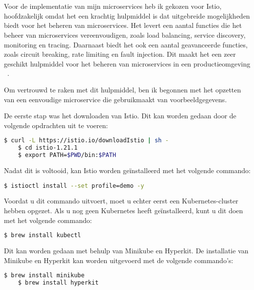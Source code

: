 \chapter*{}%
\label{ch:software}

Voor de implementatie van mijn microservices heb ik gekozen voor Istio, hoofdzakelijk omdat het een krachtig hulpmiddel is dat uitgebreide mogelijkheden biedt voor het beheren van microservices. Het levert een aantal functies die het beheer van microservices vereenvoudigen, zoals load balancing, service discovery, monitoring en tracing. Daarnaast biedt het ook een aantal geavanceerde functies, zoals circuit breaking, rate limiting en fault injection. Dit maakt het een zeer geschikt hulpmiddel voor het beheren van microservices in een productieomgeving ~\autocite{Istio}.

Om vertrouwd te raken met dit hulpmiddel, ben ik begonnen met het opzetten van een eenvoudige microservice die gebruikmaakt van voorbeeldgegevens.

De eerste stap was het downloaden van Istio. Dit kan worden gedaan door de volgende opdrachten uit te voeren:

\begin{lstlisting}[language=bash]
	$ curl -L https://istio.io/downloadIstio | sh -
	$ cd istio-1.21.1
	$ export PATH=$PWD/bin:$PATH
\end{lstlisting}

Nadat dit is voltooid, kan Istio worden geïnstalleerd met het volgende commando:

\begin{lstlisting}[language=bash]
	$ istioctl install --set profile=demo -y
\end{lstlisting}

Voordat u dit commando uitvoert, moet u echter eerst een Kubernetes-cluster hebben opgezet. Als u nog geen Kubernetes heeft geïnstalleerd, kunt u dit doen met het volgende commando:

\begin{lstlisting}[language=bash]
	$ brew install kubectl
\end{lstlisting}

Dit kan worden gedaan met behulp van Minikube en Hyperkit. De installatie van Minikube en Hyperkit kan worden uitgevoerd met de volgende commando's:

\begin{lstlisting}[language=bash]
	$ brew install minikube
	$ brew install hyperkit
\end{lstlisting}

